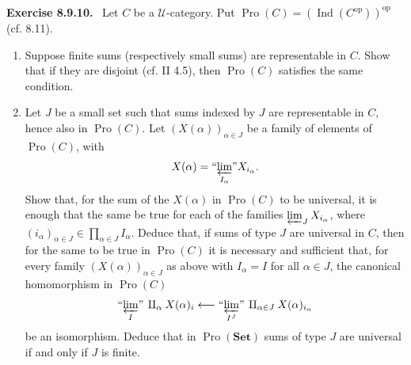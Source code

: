 \documentclass[11pt]{article}
\newcommand{\U}{\mathcal{U}}
\newcommand{\Set}{\mathbf{Set}}
\newcommand{\Ind}{\operatorname{Ind}}
\newcommand{\Pro}{\operatorname{Pro}}
\newcommand{\op}{\mathrm{op}}
\newcommand{\prolimI}[1]{\textrm{``}\!\varprojlim_{#1}\!\textrm{''}}
\newenvironment{statement}[1]{\par\medskip\noindent\textbf{#1.}\ }{\par\medskip}
\begin{document}
\begin{statement}{Exercise 8.9.10}
Let $C$ be a $\U$-category. Put $\Pro(C)=(\Ind(C^\op))^\op$ (cf. 8.11).
\begin{enumerate}[label=\alph*)]
\item Suppose finite sums (respectively small sums) are representable in $C$. Show that if they are disjoint (cf. II 4.5), then $\Pro(C)$ satisfies the same condition.

\item Let $J$ be a small set such that sums indexed by $J$ are representable in $C$, hence also in $\Pro(C)$. Let $(X(\alpha))_{\alpha\in J}$ be a family of elements of $\Pro(C)$, with
\[
 X(\alpha)=\prolimI{I_\alpha}X_{i_\alpha}.
\]
Show that, for the sum of the $X(\alpha)$ in $\Pro(C)$ to be universal, it is enough that the same be true for each of the families $\varprojlim_J X_{i_\alpha}$, where $(i_\alpha)_{\alpha\in J}\in\prod_{\alpha\in J}I_\alpha$. Deduce that, if sums of type $J$ are universal in $C$, then for the same to be true in $\Pro(C)$ it is necessary and sufficient that, for every family $(X(\alpha))_{\alpha\in J}$ as above with $I_\alpha=I$ for all $\alpha\in J$, the canonical homomorphism in $\Pro(C)$
\[
 \prolimI{I}\,\amalg_\alpha X(\alpha)_i
 \longleftarrow
 \prolimI{I^J}\,\amalg_{\alpha\in J}X(\alpha)_{i_\alpha}
\]
be an isomorphism. Deduce that in $\Pro(\Set)$ sums of type $J$ are universal if and only if $J$ is finite.
\end{enumerate}
\end{statement}
\end{document}
